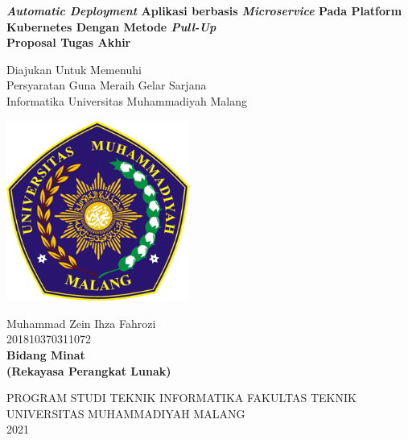 \begin{titlepage}
	\begin{center}
		\onehalfspacing
		\large \bfseries \textit{Automatic Deployment}  Aplikasi berbasis \textit{Microservice} Pada Platform Kubernetes Dengan Metode \textit{Pull-Up} \\
		\vspace{1cm}
		\large Proposal Tugas Akhir \\
		\vspace{0.5cm}

		{\small \normalfont Diajukan Untuk Memenuhi\\
			Persyaratan Guna Meraih Gelar Sarjana\\
			Informatika Universitas Muhammadiyah Malang}
		\vspace{2cm}

		\includegraphics[width=6cm]{images/logo_umm.png}

		\vspace{1cm}
		\normalfont \normalsize Muhammad Zein Ihza Fahrozi \\
		\normalfont \normalsize 201810370311072 \\

		\vspace{1cm}
		\bfseries \normalsize Bidang Minat \\
		\normalfont \normalsize (Rekayasa Perangkat Lunak)

		\vspace{2.5cm}

		\normalsize PROGRAM STUDI TEKNIK INFORMATIKA FAKULTAS TEKNIK \\
		UNIVERSITAS MUHAMMADIYAH MALANG \\
		2021



	\end{center}

\end{titlepage}

\newpage